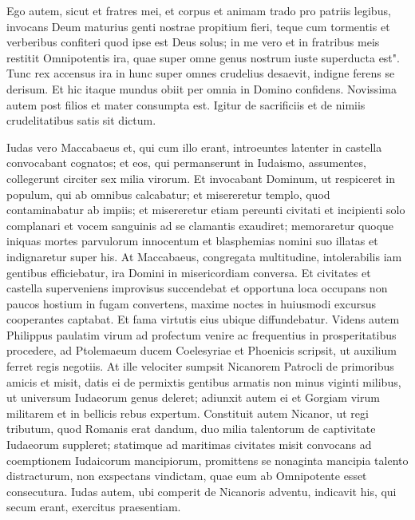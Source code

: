 \begin{biblechapter}
\verse Ego autem, sicut et fratres mei, et corpus et animam trado pro patriis legibus, invocans Deum maturius genti nostrae propitium fieri, teque cum tormentis et verberibus confiteri quod ipse est Deus solus; 
\verse in me vero et in fratribus meis restitit Omnipotentis ira, quae super omne genus nostrum iuste superducta est". 
\verse Tunc rex accensus ira in hunc super omnes crudelius desaevit, indigne ferens se derisum. 
\verse Et hic itaque mundus obiit per omnia in Domino confidens. 
\verse Novissima autem post filios et mater consumpta est. 
\verse Igitur de sacrificiis et de nimiis crudelitatibus satis sit dictum. 
\end{biblechapter}

\begin{biblechapter}  
\verse Iudas vero Maccabaeus et, qui cum illo erant, introeuntes latenter in castella convocabant cognatos; et eos, qui permanserunt in Iudaismo, assumentes, collegerunt circiter sex milia virorum. 
\verse Et invocabant Dominum, ut respiceret in populum, qui ab omnibus calcabatur; et misereretur templo, quod contaminabatur ab impiis; 
\verse et misereretur etiam pereunti civitati et incipienti solo complanari et vocem sanguinis ad se clamantis exaudiret; 
\verse memoraretur quoque iniquas mortes parvulorum innocentum et blasphemias nomini suo illatas et indignaretur super his. 
\verse At Maccabaeus, congregata multitudine, intolerabilis iam gentibus efficiebatur, ira Domini in misericordiam conversa. 
\verse Et civitates et castella superveniens improvisus succendebat et opportuna loca occupans non paucos hostium in fugam convertens,  
\verse maxime noctes in huiusmodi excursus cooperantes captabat. Et fama virtutis eius ubique diffundebatur. 
\verse Videns autem Philippus paulatim virum ad profectum venire ac frequentius in prosperitatibus procedere, ad Ptolemaeum ducem Coelesyriae et Phoenicis scripsit, ut auxilium ferret regis negotiis. 
\verse At ille velociter sumpsit Nicanorem Patrocli de primoribus amicis et misit, datis ei de permixtis gentibus armatis non minus viginti milibus, ut universum Iudaeorum genus deleret; adiunxit autem ei et Gorgiam virum militarem et in bellicis rebus expertum.  
\verse Constituit autem Nicanor, ut regi tributum, quod Romanis erat dandum, duo milia talentorum de captivitate Iudaeorum suppleret; 
\verse statimque ad maritimas civitates misit convocans ad coemptionem Iudaicorum mancipiorum, promittens se nonaginta mancipia talento distracturum, non exspectans vindictam, quae eum ab Omnipotente esset consecutura. 
\verse Iudas autem, ubi comperit de Nicanoris adventu, indicavit his, qui secum erant, exercitus praesentiam. 

\end{biblechapter}
